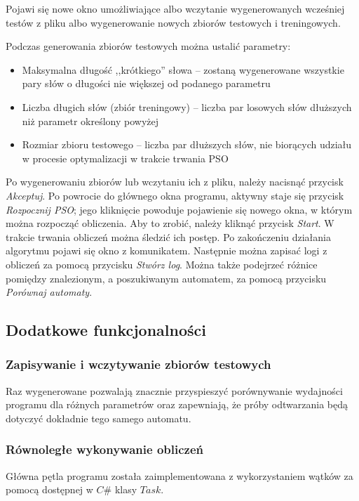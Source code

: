 \documentclass{../llncs_template_final/llncs}
\begin{document}
Pojawi się nowe okno umożliwiające albo wczytanie wygenerowanych wcześniej testów z pliku albo wygenerowanie nowych zbiorów testowych i treningowych.

 Podczas generowania zbiorów testowych można ustalić parametry:

\begin{itemize}
\item Maksymalna długość ,,krótkiego'' słowa -- zostaną wygenerowane wszystkie pary słów o długości nie większej od podanego parametru
\item Liczba długich słów (zbiór treningowy) -- liczba par losowych słów dłuższych niż parametr określony powyżej
\item Rozmiar zbioru testowego -- liczba par dłuższych słów, nie biorących udziału w procesie optymalizacji w trakcie trwania PSO
\end{itemize}

Po wygenerowaniu zbiorów lub wczytaniu ich z pliku, należy nacisnąć przycisk \emph{Akceptuj}. Po powrocie do głównego okna programu, aktywny staje się przycisk \emph{Rozpocznij PSO}; jego kliknięcie powoduje pojawienie się nowego okna, w którym można rozpocząć obliczenia. Aby to zrobić, należy kliknąć przycisk \emph{Start}. W trakcie trwania obliczeń można śledzić ich postęp. Po zakończeniu działania algorytmu pojawi się okno z komunikatem. Następnie można zapisać logi z obliczeń za pomocą przycisku \emph{Stwórz log}. Można także podejrzeć różnice pomiędzy znalezionym, a poszukiwanym automatem, za pomocą przycisku \emph{Porównaj automaty}. 

\subsection{Dodatkowe funkcjonalności}

\subsubsection{Zapisywanie i wczytywanie zbiorów testowych}
Raz wygenerowane pozwalają znacznie przyspieszyć porównywanie wydajności programu dla różnych parametrów oraz zapewniają, że próby odtwarzania będą dotyczyć dokładnie tego samego automatu.

\subsubsection{Równoległe wykonywanie obliczeń}
Główna pętla programu została zaimplementowana z wykorzystaniem wątków za pomocą dostępnej w $C\#$ klasy $Task$.
\end{document}
